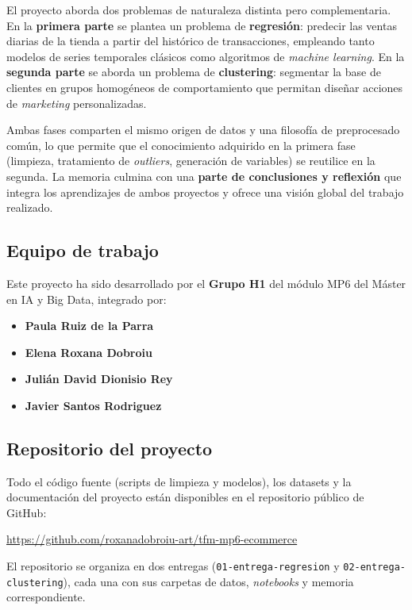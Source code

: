 \documentclass[11pt,a4paper]{article}
\begin{document}
El proyecto aborda dos problemas de naturaleza distinta pero complementaria. En la \textbf{primera parte} se plantea un problema de \textbf{regresión}: predecir las ventas diarias de la tienda a partir del histórico de transacciones, empleando tanto modelos de series temporales clásicos como algoritmos de \textit{machine learning}. En la \textbf{segunda parte} se aborda un problema de \textbf{clustering}: segmentar la base de clientes en grupos homogéneos de comportamiento que permitan diseñar acciones de \textit{marketing} personalizadas.

Ambas fases comparten el mismo origen de datos y una filosofía de preprocesado común, lo que permite que el conocimiento adquirido en la primera fase (limpieza, tratamiento de \textit{outliers}, generación de variables) se reutilice en la segunda. La memoria culmina con una \textbf{parte de conclusiones y reflexión} que integra los aprendizajes de ambos proyectos y ofrece una visión global del trabajo realizado.

\subsection*{Equipo de trabajo}

Este proyecto ha sido desarrollado por el \textbf{Grupo H1} del módulo MP6 del Máster en IA y Big Data, integrado por:

\begin{itemize}
    \item \textbf{Paula Ruiz de la Parra}
    \item \textbf{Elena Roxana Dobroiu}
    \item \textbf{Julián David Dionisio Rey}
    \item \textbf{Javier Santos Rodriguez}
\end{itemize}

\subsection*{Repositorio del proyecto}

Todo el código fuente (scripts de limpieza y modelos), los datasets y la documentación del proyecto están disponibles en el repositorio público de GitHub:

\begin{center}
\url{https://github.com/roxanadobroiu-art/tfm-mp6-ecommerce}
\end{center}

El repositorio se organiza en dos entregas (\texttt{01-entrega-regresion} y \texttt{02-entrega-clustering}), cada una con sus carpetas de datos, \textit{notebooks} y memoria correspondiente.
\end{document}
